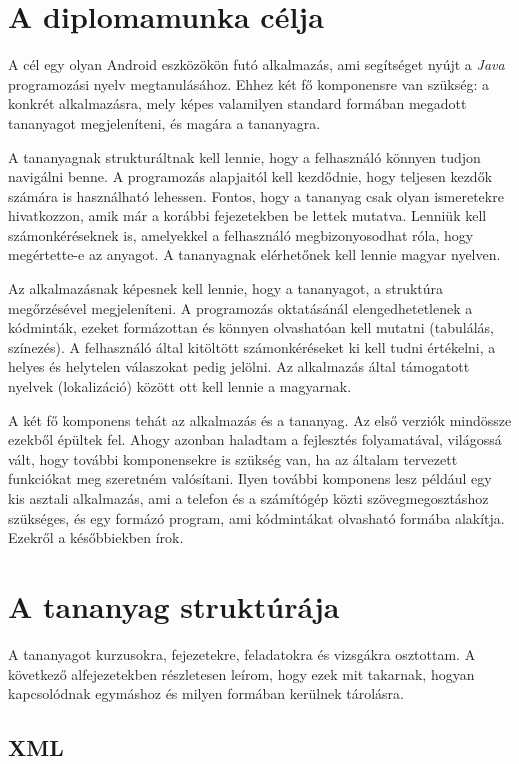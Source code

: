 \documentclass[12pt,a4paper]{article}
\begin{document}
	\section{A diplomamunka célja}
	
	A cél egy olyan Android eszközökön futó alkalmazás, ami segítséget nyújt a \textit{Java} programozási nyelv megtanulásához. Ehhez két fő komponensre van szükség: a konkrét alkalmazásra, mely képes valamilyen standard formában megadott tananyagot megjeleníteni, és magára a tananyagra. 

	A tananyagnak strukturáltnak kell lennie, hogy a felhasználó könnyen tudjon navigálni benne. A programozás alapjaitól kell kezdődnie, hogy teljesen kezdők számára is használható lehessen. Fontos, hogy a tananyag csak olyan ismeretekre hivatkozzon, amik már a korábbi fejezetekben be lettek mutatva. Lenniük kell számonkéréseknek is, amelyekkel a felhasználó megbizonyosodhat róla, hogy megértette-e az anyagot. A tananyagnak elérhetőnek kell lennie magyar nyelven.
	
	Az alkalmazásnak képesnek kell lennie, hogy a tananyagot, a struktúra megőrzésével megjeleníteni. A programozás oktatásánál elengedhetetlenek a kódminták, ezeket formázottan és könnyen olvashatóan kell mutatni (tabulálás, színezés). A felhasználó által kitöltött számonkéréseket ki kell tudni értékelni, a helyes és helytelen válaszokat pedig jelölni. Az alkalmazás által támogatott nyelvek (lokalizáció) között ott kell lennie a magyarnak.
	
	A két fő komponens tehát az alkalmazás és a tananyag. Az első verziók mindössze ezekből épültek fel. Ahogy azonban haladtam a fejlesztés folyamatával, világossá vált, hogy további komponensekre is szükség van, ha az általam tervezett funkciókat meg szeretném valósítani. Ilyen további komponens lesz például egy kis asztali alkalmazás, ami a telefon és a számítógép közti szövegmegosztáshoz szükséges, és egy formázó program, ami kódmintákat olvasható formába alakítja. Ezekről a későbbiekben írok.
	
	\section{A tananyag struktúrája}  
	
	A tananyagot kurzusokra, fejezetekre, feladatokra és vizsgákra osztottam. A következő alfejezetekben részletesen leírom, hogy ezek mit takarnak, hogyan kapcsolódnak egymáshoz és milyen formában kerülnek tárolásra.
		
	\subsection{XML}
	
\end{document}
